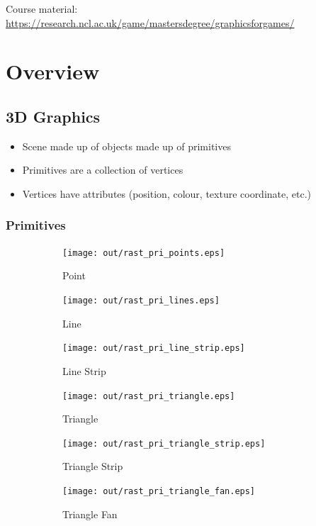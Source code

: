 \documentclass[a4paper]{article}
\begin{document}
\tableofcontents

\vfill
Course material:
\url{https://research.ncl.ac.uk/game/mastersdegree/graphicsforgames/}

\section{Overview}

\subsection{3D Graphics}

\begin{itemize}
  \item Scene made up of objects made up of primitives
  \item Primitives are a collection of vertices
  \item Vertices have attributes (position, colour, texture coordinate, etc.)
\end{itemize}

\subsubsection{Primitives}

\begin{figure}[h]
  \centering

  \begin{subfigure}[b]{0.3\textwidth}
    \texttt{[image: out/rast\_pri\_points.eps]}
    \caption{Point}
  \end{subfigure}
  \begin{subfigure}[b]{0.3\textwidth}
    \texttt{[image: out/rast\_pri\_lines.eps]}
    \caption{Line}
  \end{subfigure}
  \begin{subfigure}[b]{0.3\textwidth}
    \texttt{[image: out/rast\_pri\_line\_strip.eps]}
    \caption{Line Strip}
  \end{subfigure}

  \vspace{2em}

  \begin{subfigure}[b]{0.3\textwidth}
    \texttt{[image: out/rast\_pri\_triangle.eps]}
    \caption{Triangle}
  \end{subfigure}
  \begin{subfigure}[b]{0.3\textwidth}
    \texttt{[image: out/rast\_pri\_triangle\_strip.eps]}
    \caption{Triangle Strip}
  \end{subfigure}
  \begin{subfigure}[b]{0.3\textwidth}
    \texttt{[image: out/rast\_pri\_triangle\_fan.eps]}
    \caption{Triangle Fan}
  \end{subfigure}

  \caption{}
  \label{fig:primitives}
\end{figure}
\FloatBarrier
\end{document}
